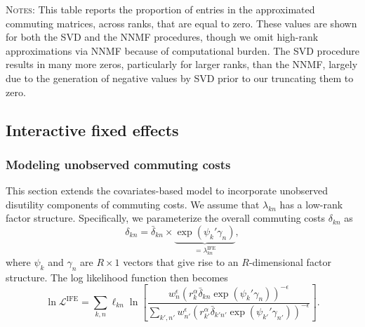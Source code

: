\documentclass[11pt]{article}
\theoremstyle{definition}
\begin{document}
\begin{table}[h!]
    \caption{Percentage (\%) of approximated commuting matrix entries equal to zero}
    \label{tab:svd:zeros}
    \vspace{-1.5em}
    \begin{center}
    
    \begin{minipage}{0.98\textwidth}
    {\footnotesize \textsc{Notes}:
    This table reports the proportion of entries in the approximated commuting matrices, across ranks, that are equal to zero. 
    These values are shown for both the SVD and the NNMF procedures, though we omit high-rank approximations via NNMF because of computational burden.
    The SVD procedure results in many more zeros, particularly for larger ranks, than the NNMF, largely due to the generation of negative values by SVD prior to our truncating them to zero.
    \par}\end{minipage}
    \end{center}
    \vspace{-1.5em}
\end{table}

\subsection{Interactive fixed effects}
\label{sec:appendix:ifes}

\subsubsection{Modeling unobserved commuting costs}

This section extends the covariates-based model to incorporate unobserved disutility components of commuting costs.
We assume that  $\lambda_{kn}$ has a low-rank factor structure.
Specifically, we parameterize the overall commuting costs \(\delta_{kn}\) as
\[\delta_{kn} = \bar{\delta}_{kn} \times \underbrace{ \exp(\psi_k'\gamma_n)}_{ = \lambda_{kn}^\mathrm{IFE}},\]
where \(\psi_k\) and \(\gamma_n\) are \(R \times 1\) vectors that give rise to an \(R\)-dimensional factor structure. 
The log likelihood function then becomes
\begin{equation}\label{eq:loglikelihood_ife}
\ln \mathcal{L}^{\mathrm{IFE}} = \sum_{k,n} \ell_{kn} \ln \left[
\frac
{{w}_{n}^\epsilon \left({r}_{k}^\alpha \bar{\delta}_{kn}\exp(\psi_k'\gamma_n)\right)^{-\epsilon}}
{\sum_{k',n'} {w}_{n'}^\epsilon \left({r}_{k'}^\alpha  \bar{\delta}_{k'n'} \exp(\psi_{k'}'\gamma_{n'})\right)^{-\epsilon}}
\right].
\end{equation}
\end{document}

